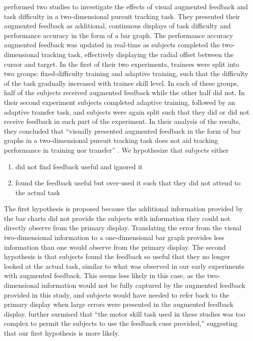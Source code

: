 \citeauthor{doi:10.1177/107118137802200127} performed two studies to investigate the effects of visual augmented feedback and task difficulty in a two-dimensional pursuit tracking task.
They presented their augmented feedback as additional, continuous displays of task difficulty and performance accuracy in the form of a bar graph.
The performance accuracy augmented feedback was updated in real-time as subjects completed the two-dimensional tracking task, effectively displaying the radial offset between the cursor and target.
In the first of their two experiments, trainees were split into two groups: fixed-difficulty training and adaptive training, such that the difficulty of the task gradually increased with trainee skill level.
In each of these groups, half of the subjects received augmented feedback while the other half did not.
In their second experiment subjects completed adaptive training, followed by an adaptive transfer task, and subjects were again split such that they did or did not receive feedback in each part of the experiment.
In their analysis of the results, they concluded that ``visually presented augmented feedback in the form of bar graphs in a two-dimensional pursuit tracking task does not aid tracking performance in training nor transfer'' \citep{doi:10.1177/107118137802200127}.
We hypothesize that subjects either
\begin{enumerate}
    \item did not find feedback useful and ignored it
    \item found the feedback useful but over-used it such that they did not attend to the actual task
\end{enumerate}
The first hypothesis is proposed because the additional information provided by the bar charts did not provide the subjects with information they could not directly observe from the primary display.
Translating the error from the visual two-dimensional information to a one-dimensional bar graph provides less information than one would observe from the primary display.
The second hypothesis is that subjects found the feedback so useful that they no longer looked at the actual task, similar to what was observed in our early experiments with augmented feedback.
This seems less likely in this case, as the two-dimensional information would not be fully captured by the augmented feedback provided in this study, and subjects would have needed to refer back to the primary display when large errors were presented in the augmented feedback display.
\citeauthor{doi:10.1177/107118137802200127} further surmised that ``the motor skill task used in these studies was too complex to permit the subjects to use the feedback cues provided,'' suggesting that our first hypothesis is more likely.

